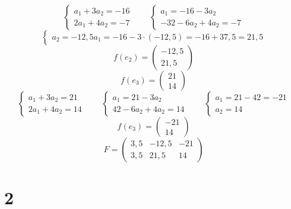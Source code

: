 $$
\begin{cases}
	a_1 + 3a_2 = -16 \\
    2a_1 + 4a_2 = -7
\end{cases} \qquad
\begin{cases}
	a_1 = -16 - 3a_2 \\
    -32 - 6a_2 + 4a_2 = -7
\end{cases} $$
$$
\begin{cases}
	a_2 = -12,5
    a_1 = -16 - 3 \cdot (-12,5) = -16 + 37,5 = 21,5
\end{cases} $$
$$ f(e_2) =
\begin{pmatrix}
	-12,5 \\
    21,5
\end{pmatrix} $$
$$ f(e_3) =
\begin{pmatrix}
	21 \\
    14
\end{pmatrix} $$
$$
\begin{cases}
	a_1 + 3a_2 = 21 \\
    2a_1 + 4a_2 = 14
\end{cases} \qquad
\begin{cases}
	a_1 = 21 - 3a_2 \\
    42 - 6a_2 + 4a_2 = 14
\end{cases} \qquad
\begin{cases}
	a_1 = 21 - 42 = -21 \\
    a_2 = 14
\end{cases} $$
$$ f(e_3) =
\begin{pmatrix}
	-21 \\
    14
\end{pmatrix} $$
$$ F =
\begin{pmatrix}
	3,5 & -12,5 & -21 \\
    3,5 & 21,5 & 14
\end{pmatrix} $$

\section{2}

